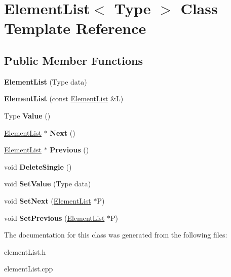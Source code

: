 \hypertarget{class_element_list}{}\section{Element\+List$<$ Type $>$ Class Template Reference}
\label{class_element_list}
\subsection*{Public Member Functions}
\begin{DoxyCompactItemize}
\item 
{\bfseries Element\+List} (Type data)\hypertarget{class_element_list_a657d74f5aeb35a37e262e4a2cb7b192a}{}\label{class_element_list_a657d74f5aeb35a37e262e4a2cb7b192a}

\item 
{\bfseries Element\+List} (const \hyperlink{class_element_list}{Element\+List} \&L)\hypertarget{class_element_list_a49ce6d6ce708ead740dcfbaa26513603}{}\label{class_element_list_a49ce6d6ce708ead740dcfbaa26513603}

\item 
Type {\bfseries Value} ()\hypertarget{class_element_list_a0f874b08fce53174aa75eedf45682d64}{}\label{class_element_list_a0f874b08fce53174aa75eedf45682d64}

\item 
\hyperlink{class_element_list}{Element\+List} $\ast$ {\bfseries Next} ()\hypertarget{class_element_list_a2644dc854591779ec7220fd56e0a16ba}{}\label{class_element_list_a2644dc854591779ec7220fd56e0a16ba}

\item 
\hyperlink{class_element_list}{Element\+List} $\ast$ {\bfseries Previous} ()\hypertarget{class_element_list_a5144ccc57d38ce60ec3d5d82471579f6}{}\label{class_element_list_a5144ccc57d38ce60ec3d5d82471579f6}

\item 
void {\bfseries Delete\+Single} ()\hypertarget{class_element_list_a55fedd16d90c0b856117e02e837e311e}{}\label{class_element_list_a55fedd16d90c0b856117e02e837e311e}

\item 
void {\bfseries Set\+Value} (Type data)\hypertarget{class_element_list_af97aecca1b4863e795cf675f29ca7d13}{}\label{class_element_list_af97aecca1b4863e795cf675f29ca7d13}

\item 
void {\bfseries Set\+Next} (\hyperlink{class_element_list}{Element\+List} $\ast$P)\hypertarget{class_element_list_af4c19f75c4c93b69f2023420ba477f7d}{}\label{class_element_list_af4c19f75c4c93b69f2023420ba477f7d}

\item 
void {\bfseries Set\+Previous} (\hyperlink{class_element_list}{Element\+List} $\ast$P)\hypertarget{class_element_list_a60590a74e879b84d87dc3f32bd9ad801}{}\label{class_element_list_a60590a74e879b84d87dc3f32bd9ad801}

\end{DoxyCompactItemize}


The documentation for this class was generated from the following files\+:\begin{DoxyCompactItemize}
\item 
element\+List.\+h\item 
element\+List.\+cpp\end{DoxyCompactItemize}
